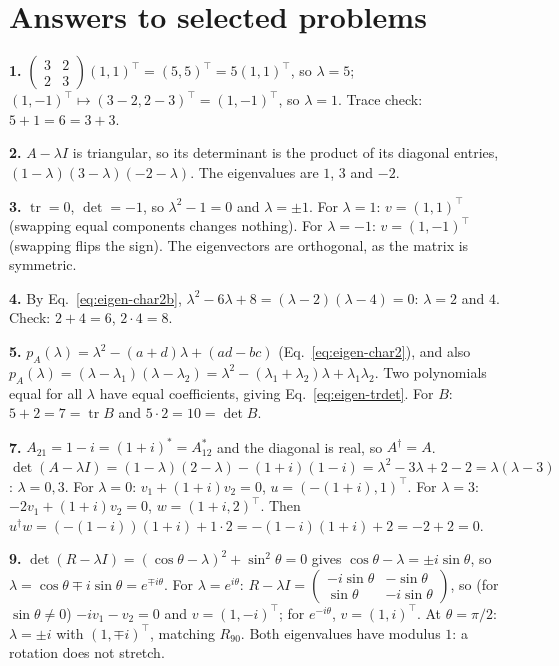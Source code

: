 \section{Answers to selected problems}

\textbf{1.} $\begin{pmatrix}3&2\\2&3\end{pmatrix}(1,1)^\top=(5,5)^\top=5(1,1)^\top$, so $\lambda=5$; $(1,-1)^\top\mapsto(3-2,2-3)^\top=(1,-1)^\top$, so $\lambda=1$. Trace check: $5+1=6=3+3$.

\textbf{2.} $A-\lambda I$ is triangular, so its determinant is the product of its diagonal entries, $(1-\lambda)(3-\lambda)(-2-\lambda)$. The eigenvalues are $1$, $3$ and $-2$.

\textbf{3.} $\operatorname{tr}=0$, $\det=-1$, so $\lambda^2-1=0$ and $\lambda=\pm1$. For $\lambda=1$: $v=(1,1)^\top$ (swapping equal components changes nothing). For $\lambda=-1$: $v=(1,-1)^\top$ (swapping flips the sign). The eigenvectors are orthogonal, as the matrix is symmetric.

\textbf{4.} By Eq.~\eqref{eq:eigen-char2b}, $\lambda^2-6\lambda+8=(\lambda-2)(\lambda-4)=0$: $\lambda=2$ and $4$. Check: $2+4=6$, $2\cdot4=8$.

\textbf{5.} $p_A(\lambda)=\lambda^2-(a+d)\lambda+(ad-bc)$ (Eq.~\eqref{eq:eigen-char2}), and also $p_A(\lambda)=(\lambda-\lambda_1)(\lambda-\lambda_2)=\lambda^2-(\lambda_1+\lambda_2)\lambda+\lambda_1\lambda_2$. Two polynomials equal for all $\lambda$ have equal coefficients, giving Eq.~\eqref{eq:eigen-trdet}. For $B$: $5+2=7=\operatorname{tr}B$ and $5\cdot2=10=\det B$.

\textbf{7.} $A_{21}=1-i=(1+i)^*=A_{12}^*$ and the diagonal is real, so $A^\dagger=A$. $\det(A-\lambda I)=(1-\lambda)(2-\lambda)-(1+i)(1-i)=\lambda^2-3\lambda+2-2=\lambda(\lambda-3)$: $\lambda=0,3$. For $\lambda=0$: $v_1+(1+i)v_2=0$, $u=(-(1+i),1)^\top$. For $\lambda=3$: $-2v_1+(1+i)v_2=0$, $w=(1+i,2)^\top$. Then $u^\dagger w=(-(1-i))(1+i)+1\cdot2=-(1-i)(1+i)+2=-2+2=0$.

\textbf{9.} $\det(R-\lambda I)=(\cos\theta-\lambda)^2+\sin^2\theta=0$ gives $\cos\theta-\lambda=\pm i\sin\theta$, so $\lambda=\cos\theta\mp i\sin\theta=e^{\mp i\theta}$. For $\lambda=e^{i\theta}$: $R-\lambda I=\begin{pmatrix}-i\sin\theta&-\sin\theta\\\sin\theta&-i\sin\theta\end{pmatrix}$, so (for $\sin\theta\ne0$) $-iv_1-v_2=0$ and $v=(1,-i)^\top$; for $e^{-i\theta}$, $v=(1,i)^\top$. At $\theta=\pi/2$: $\lambda=\pm i$ with $(1,\mp i)^\top$, matching $R_{90}$. Both eigenvalues have modulus $1$: a rotation does not stretch.

